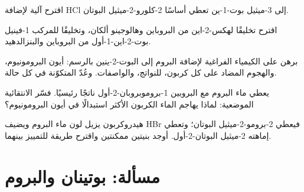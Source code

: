 \begin{exercise}[$\star\star$]\label{exo:b1:electrophilic-additions:8}
اقترح آلية لإضافة HCl إلى 3-ميثيل بوت-1-ين
تعطي أساسًا 2-كلورو-2-ميثيل البوتان.
\end{exercise}

\begin{exercise}[$\star\star$]\label{exo:b1:electrophilic-additions:9}
اقترح تخليقًا لهكس-2-اين من البروباين وهالوجينو ألكان،
وتخليقًا للمركب 1-فينيل بوت-2-اين-1-أول من البروباين والبنزالدهيد.
\end{exercise}

\begin{exercise}[$\star\star\star$]\label{exo:b1:electrophilic-additions:10}
برهن على الكيمياء الفراغية لإضافة البروم إلى البوت-2-ينين بالرسم:
أيون البرومونيوم، والهجوم المضاد على كل كربون، 
للنواتج، والواصفات. وعُدّ  المتكوّنة في كل
حالة.
\end{exercise}

\begin{exercise}[$\star\star\star$]\label{exo:b1:electrophilic-additions:11}
يعطي ماء البروم مع البروبين 1-بروموبروبان-2-أول ناتجًا رئيسيًا.
فسّر الانتقائية الموضعية: لماذا يهاجم الماء الكربون الأكثر استبدالًا
في أيون البرومونيوم؟
\end{exercise}

\begin{exercise}[$\star\star\star$]\label{exo:b1:electrophilic-additions:12}
هيدروكربون  يزيل لون ماء البروم ويضيف HBr فيعطي
2-برومو-2-ميثيل البوتان؛ وتعطي إماهته 2-ميثيل البوتان-2-أول. أوجد بنيتين
ممكنتين واقترح طريقة للتمييز بينهما.
\end{exercise}

\section{مسألة: بوتينان والبروم}

